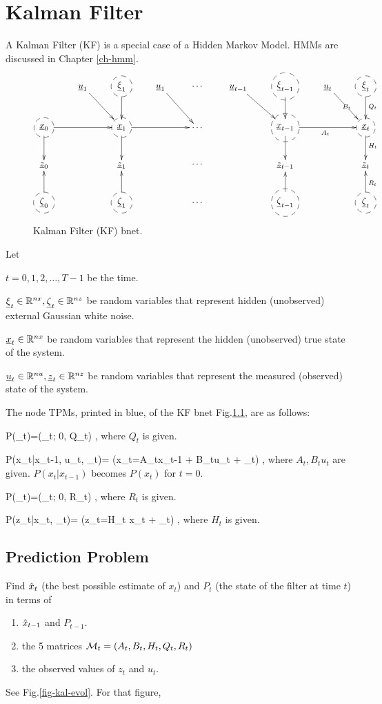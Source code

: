 \chapter{Kalman Filter}\label{ch-kalman}

A Kalman Filter (KF) is a special case of a
Hidden Markov Model. HMMs are
 discussed in Chapter \ref{ch-hmm}.

\begin{figure}[h!]
\centering
$$\xymatrix{
&\rvu_1\ar[dr]
&*++[F-o]{\rvxi_1}\ar[d]
&\rvu_1\ar[dr]
&\cdots
&\rvu_{t-1}\ar[dr]
&*++[F-o]{\rvxi_{t-1}}\ar[d]
&\rvu_t\ar[dr]|{B_t}
&*++[F-o]{\rvxi_{t}}\ar[d]^{Q_t}
\\
*++[F-o]{\rvx_0}\ar[d]\ar[rr]
&&*++[F-o]{\rvx_1}\ar[d]\ar[rr]
&&\cdots
&&*++[F-o]{\rvx_{t-1}}\ar[d]\ar[rr]_{A_t}
&&*++[F-o]{\rvx_{t}}\ar[d]^{H_t}
\\
\rvz_0
&&\rvz_1
&&\cdots
&&\rvz_{t-1}
&
&\rvz_{t}
\\
*++[F-o]{\rvzeta_0}\ar[u]
&&*++[F-o]{\rvzeta_1}\ar[u]
&&\cdots
&&*++[F-o]{\rvzeta_{t-1}}\ar[u]
&&*++[F-o]{\rvzeta_{t}}\ar[u]_{R_t}
}$$
\caption{Kalman Filter (KF) bnet.}
\label{fig-kal}
\end{figure}

Let 

$t=0, 1, 2, \dots , T-1$ be the time.

${\underline{\xi}}_t\in{ \mathbb{R}}^{nx},
 {\underline{\zeta}}_t\in { \mathbb{R}}^{nz}$ be
random variables that represent
hidden (unobserved)   external
Gaussian white noise.

${\underline{x}}_t\in { \mathbb{R}}^{nx}$ be
random variables that represent
the hidden (unobserved) true
state of the system.

${\underline{u}}_t\in { \mathbb{R}}^{nu}, 
{\underline{z}}_t\in { \mathbb{R}}^{nz}$ be
random variables that represent
the measured (observed) 
state of the system.


The 
node TPMs,
printed in blue,
of the KF bnet Fig.\ref{fig-kal},
are as follows:

\beq\color{blue}
P(\xi_t)=\caln(\xi_t; 0, Q_t)
\;,
\eeq
where $Q_t$ is given.


\beq\color{blue}
P(x_t|x_{t-1}, u_t, \xi_t)=
\indi(x_t=A_tx_{t-1} + B_tu_t + \xi_t)
\;,
\eeq
where $A_t, B_tu_t$
are given. $P(x_t|x_{t-1})$ becomes $P(x_t)$
for $t=0$.

\beq\color{blue}
P(\zeta_t)=\caln(\zeta_t; 0, R_t)
\;,
\eeq
where $R_t$ is given.

\beq\color{blue}
P(z_t|x_t, \zeta_t)=
\indi(z_t=H_t x_t +  \zeta_t)
\;,
\eeq
where $H_t$ is given.


\section{Prediction
Problem}
Find ${\hat{x}}_t$ (the 
best possible estimate
of $x_t$)
and $P_t$ (the state of the 
filter at time $t$)
in terms of 
\begin{enumerate}
\item
${\hat{x}}_{t-1}$
and $P_{t-1}$.
\item
 the 5 matrices
${\cal M}_t=(A_t,B_t,H_t,Q_t,R_t)$
\item
the observed  values of 
$z_t$ and $u_t$.

\end{enumerate}
See Fig.\ref{fig-kal-evol}.
For that figure,

